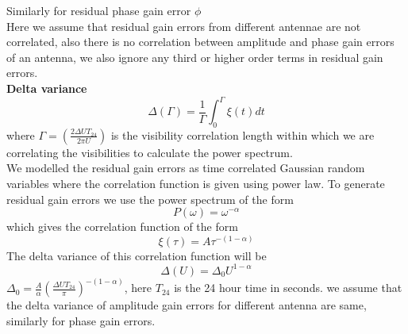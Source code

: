 \documentclass[fleqn,usenatbib]{mnras}
\begin{document}
 Similarly for residual phase gain error $ \phi $\\
 Here we assume that residual gain errors from different antennae are not correlated, also there is no correlation between amplitude and phase gain errors of an antenna, we also ignore any third or higher order terms in residual gain errors.\\
 \textbf{Delta variance}
\begin{equation}
    \Delta(\Gamma) = \frac{1}{\Gamma} \int _0 ^{\Gamma} \xi (t) dt
\end{equation}
where $\Gamma = (\frac{2\Delta U T_{24}}{2\pi U})$ is the visibility correlation length within which we are correlating the visibilities to calculate the power spectrum.\\
We modelled the residual gain errors as time correlated Gaussian random variables where the correlation function is given using power law. To generate residual gain errors we use the power spectrum of the form
\begin{equation}
    P(\omega) = \omega ^{-\alpha}
\end{equation}
which gives the correlation function of the form
\begin{equation}
    \xi(\tau) = A\tau^{-(1-\alpha)}
\end{equation}
The delta variance of this correlation function will be
\begin{equation}
     \Delta(U) = \Delta_0 U^{1-\alpha}
\end{equation}
 $\Delta_0 = \frac{A}{\alpha} (\frac{\Delta U T_{24}}{\pi})^{-(1-\alpha)}$, here $T_{24}$ is the 24 hour time in seconds. 
 we assume that the delta variance of amplitude gain errors for different antenna are same, similarly for phase gain errors.\\
\end{document}
